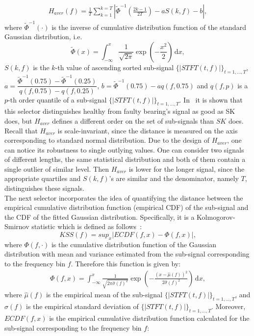 \documentclass[11pt]{article} %
\begin{document}
\begin{eqnarray}
H_{aver}(f)=\frac{1}{T}\sum_{k=1}^{k=T}{ \left| \widetilde{\Phi}^{-1}\left(\frac{2k-1}{2T} \right) - a S(k,f)-b \right| },
\end{eqnarray}
where $\widetilde{\Phi}^{-1}(\cdot)$ is the inverse of cumulative distribution function of the standard Gaussian distribution, i.e. $$\widetilde{\Phi}(x)=\int^{x}_{-\infty} \! \frac{1}{\sqrt{2\pi}}\exp \left( -\frac{x^2}{2} \right) \, \mathrm{d} x,$$ $S(k,f)$ is the $k$-th value of ascending sorted sub-signal $\{|STFT(t,f)|\}_{t=1,\ldots,T}$, $a=\dfrac{\widetilde{\Phi}^{-1}(0.75)-\widetilde{\Phi}^{-1}(0.25)}{q(f,0.75)-q(f,0.25)}$, $b=\widetilde{\Phi}^{-1}(0.75)-aq(f,0.75)$ and $q(f,p)$ is a $p$-th order quantile of a sub-signal $\{|STFT(t,f)|\}_{t=1,\ldots,T}$. In~\cite{bib04} it is shown that this selector distinguishes healthy from faulty bearing's signal as good as SK does, but $H_{aver}$ defines a different order on the set of sub-signals than $SK$ does. Recall that $H_{aver}$ is scale-invariant, since the distance is measured on the axis corresponding to standard normal distribution. Due to the design of $H_{aver}$, one can notice its robustness to single outlying values. One can consider two signals of different lengths, the same statistical distribution and both of them contain a single outlier of similar level. Then $H_{aver}$ is lower for the longer signal, since the appropriate quartiles and $S(k,f)$'s are similar and the denominator, namely $T$, distinguishes these signals.\\
The next selector incorporates the idea of quantifying the distance between the empirical cumulative distribution function (empirical CDF) of the sub-signal and the CDF of the fitted Gaussian distribution. Specifically, it is a Kolmogorov-Smirnov statistic which is defined as follows~\cite{SelectorsMSSP,bib07,bib08}:
\begin{equation}\label{K-S}
KSS(f)=sup_x\left|ECDF(f,x)-\Phi(f,x)\right|,
\end{equation}
where $\Phi(f,\cdot)$ is the cumulative distribution function of the Gaussian distribution with mean and variance estimated from the sub-signal corresponding to the frequency bin $f$. Therefore this function is given by:
\begin{eqnarray}\label{FF}
\Phi(f,x)=\int^{x}_{-\infty} \! \frac{1}{\sqrt{2\pi\widehat{\sigma}(f)^2}}\exp \left( -\frac{\left(x-\widehat{\mu}(f)\right)^2}{2\widehat{\sigma}(f)^2} \right) \, \mathrm{d} x,
\end{eqnarray}
where $\widehat{\mu}(f)$ is the empirical mean of the sub-signal $\{|STFT(t,f)|\}_{t=1,\ldots,T}$, and $\widehat{\sigma}(f)$ is the empirical standard deviation of $\{|STFT(t,f)|\}_{t=1,\ldots,T}$. Moreover, $ECDF(f,x)$ is the empirical cumulative distribution function calculated for the sub-signal corresponding to the frequency bin $f$:
\end{document}
